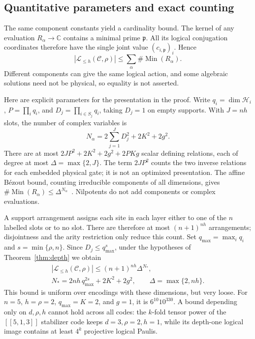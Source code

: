\documentclass[aps,prl,reprint,notitlepage,nofootinbib,nobibnotes]{revtex4-2}
\newcommand{\HH}{\mathcal H}
\begin{document}
\subsection*{Quantitative parameters and exact counting}

The same component constants yield a cardinality bound. The kernel of
any evaluation \(R_\alpha\to\mathbb C\) contains a minimal prime
\(\mathfrak p\). All its logical conjugation coordinates therefore
have the single joint value \((c_{i,\mathfrak p})_i\). Hence
\begin{equation}\label{eq:component-bound}
 |\mathcal L_{\le h}(\mathcal C,\rho)|
 \le \sum_\alpha \#\operatorname{Min}(R_\alpha).
\end{equation}
Different components can give the same logical action, and some
algebraic solutions need not be physical, so equality is not asserted.

Here are explicit parameters for the presentation in the proof.
Write \(q_i=\dim\HH_i\), \(P=\prod_iq_i\), and
\(D_j=\prod_{i\in S_j}q_i\), taking \(D_j=1\) on empty supports.
With \(J=nh\) slots, the number of complex variables is
\begin{equation}\label{eq:coordinate-count}
 N_\alpha=2\sum_{j=1}^{J}D_j^2+2K^2+2g^2.
\end{equation}
There are at most
\(2JP^2+2K^2+2g^2+2PKg\) scalar defining relations, each of degree
at most \(\Delta=\max\{2,J\}\). The term \(2JP^2\) counts the two
inverse relations for each embedded physical gate; it is not an
optimized presentation. The affine B\'ezout bound, counting
irreducible components of all dimensions, gives
\(\#\operatorname{Min}(R_\alpha)\le\Delta^{N_\alpha}\)~\cite{BurgisserScheiblechner}.
Nilpotents do not add components or complex evaluations.

A support arrangement assigns each site in each layer either to one
of the \(n\) labelled slots or to no slot. There are therefore at most
\((n+1)^{nh}\) arrangements; disjointness and the arity restriction
only reduce this count. Set \(q_{\max}=\max_iq_i\) and
\(s=\min\{\rho,n\}\). Since \(D_j\le q_{\max}^{s}\), under the
hypotheses of Theorem~\ref{thm:depth} we obtain
\begin{equation}\label{eq:explicit-bound}
 \begin{gathered}
 |\mathcal L_{\le h}(\mathcal C,\rho)|
       \le (n+1)^{nh}\Delta^{N_*},\\
 N_*=2nh\,q_{\max}^{2s}+2K^2+2g^2,\qquad
 \Delta=\max\{2,nh\}.
 \end{gathered}
\end{equation}
This bound is uniform over encodings with these dimensions, but very
loose. For \(n=5\), \(h=\rho=2\), \(q_{\max}=K=2\), and \(g=1\),
it is \(6^{10}10^{330}\). A bound depending only on \(d,\rho,h\)
cannot hold across all codes: the \(k\)-fold tensor power of the
\([[5,1,3]]\) stabilizer code keeps \(d=3,\rho=2,h=1\), while its
depth-one logical image contains at least \(4^k\) projective logical
Paulis.
\end{document}

